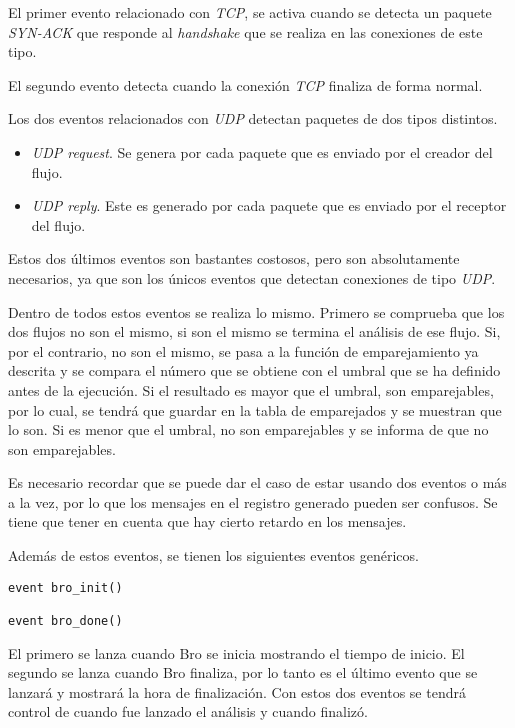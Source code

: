 \intro El primer evento relacionado con \textit{TCP}, se activa cuando se detecta un paquete \textit{SYN-ACK} que 
responde al \textit{handshake} que se realiza en las conexiones de este tipo.

\intro El segundo evento detecta cuando la conexión \textit{TCP} finaliza de forma normal.

\intro Los dos eventos relacionados con \textit{UDP} detectan paquetes de dos tipos distintos.

\begin{itemize}
\item \textit{UDP request}. Se genera por cada paquete que es enviado por el creador del flujo.
\item \textit{UDP reply}. Este es generado por cada paquete que es enviado por el receptor del flujo.
\end{itemize}

\intro Estos dos últimos eventos son bastantes costosos, pero son absolutamente necesarios, ya que son los únicos 
eventos que detectan conexiones de tipo \textit{UDP}.

\intro Dentro de todos estos eventos se realiza lo mismo. Primero se comprueba que los dos flujos no son el mismo, 
si son el mismo se termina el análisis de ese flujo. Si, por el contrario, no son el mismo, se pasa a la función de emparejamiento ya 
descrita y se compara el número que se obtiene con el umbral que se ha definido antes de la ejecución. Si el resultado es 
mayor que el umbral, son emparejables, por lo cual, se tendrá que guardar en la tabla de emparejados y se muestran que lo son. Si es 
menor que el umbral, no son emparejables y se informa de que no son emparejables.

\intro Es necesario recordar que se puede dar el caso de estar usando dos eventos o más a la vez, por lo que los 
mensajes en el registro generado pueden ser confusos. Se tiene que tener en cuenta que hay cierto retardo en los mensajes.

\intro Además de estos eventos, se tienen los siguientes eventos genéricos.

\begin{lstlisting}[style=CodigoC]
event bro_init()

event bro_done()
\end{lstlisting}

\intro El primero se lanza cuando Bro se inicia mostrando el tiempo de inicio. El segundo se lanza cuando 
Bro finaliza, por lo tanto es el último evento que se lanzará y mostrará la hora de finalización. Con estos 
dos eventos se tendrá control de cuando fue lanzado el análisis y cuando finalizó.

